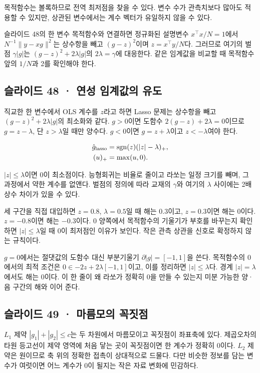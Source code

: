 \documentclass[11pt,a4paper]{article}
\begin{document}
목적함수는 볼록하므로 전역 최저점을 찾을 수 있다. 변수 수가 관측치보다 많아도 적용할 수 있지만, 상관된 변수에서는 계수 벡터가 유일하지 않을 수 있다.\par

슬라이드 48의 한 변수 목적함수와 연결하면 정규화된 설명변수 $x^\top x/N=1$에서 $N^{-1}\|y-xg\|^2$는 상수항을 빼고 $(g-z)^2$이며 $z=x^\top y/N$다. 그러므로 여기의 벌점 $\gamma|g|$는 $(g-z)^2+2\lambda|g|$의 $2\lambda=\gamma$에 대응한다. 같은 임계값을 비교할 때 목적함수 앞의 $1/N$과 2를 확인해야 한다.\par

\subsection{슬라이드 48 · 연성 임계값의 유도}
직교한 한 변수에서 OLS 계수를 $z$라고 하면 Lasso 문제는 상수항을 빼고 $(g-z)^2+2\lambda|g|$의 최소화와 같다. $g>0$이면 도함수 $2(g-z)+2\lambda=0$이므로 $g=z-\lambda$, 단 $z>\lambda$일 때만 양수다. $g<0$이면 $g=z+\lambda$이고 $z<-\lambda$여야 한다.\par

\[
\begin{aligned}
\hat g_{\rm lasso}&=\operatorname{sgn}(z)(|z|-\lambda)_+,\\
(u)_+&=\max(u,0).
\end{aligned}
\]

$|z|\le\lambda$이면 0이 최소점이다. 능형회귀는 비율로 줄이고 라쏘는 일정 크기를 빼며, 그 과정에서 약한 계수를 없앤다. 벌점의 정의에 따라 교재의 $\gamma$와 여기의 $\lambda$ 사이에는 2배 상수 차이가 있을 수 있다.\par

세 구간을 직접 대입하면 $z=0.8$, $\lambda=0.5$일 때 해는 0.3이고, $z=0.3$이면 해는 0이다. $z=-0.8$이면 해는 $-0.3$이다. 0 양쪽에서 목적함수의 기울기가 부호를 바꾸는지 확인하면 $|z|\le\lambda$일 때 0이 최저점인 이유가 보인다. 작은 관측 상관을 신호로 확정하지 않는 규칙이다.\par

$g=0$에서는 절댓값의 도함수 대신 부분기울기 $\partial|g|=[-1,1]$을 쓴다. 목적함수의 0에서의 최적 조건은 $0\in-2z+2\lambda[-1,1]$이고, 이를 정리하면 $|z|\le\lambda$다. 경계 $|z|=\lambda$에서도 해는 0이다. 이 한 줄이 왜 라쏘가 정확히 0을 만들 수 있는지 미분 가능한 양·음 구간의 해와 이어 준다.\par

\subsection{슬라이드 49 · 마름모의 꼭짓점}
$L_1$ 제약 $|g_1|+|g_2|\le c$는 두 차원에서 마름모이고 꼭짓점이 좌표축에 있다. 제곱오차의 타원 등고선이 제약 영역에 처음 닿는 곳이 꼭짓점이면 한 계수가 정확히 0이다. $L_2$ 제약은 원이므로 축 위의 정확한 접촉이 상대적으로 드물다. 다만 비슷한 정보를 담는 변수가 여럿이면 어느 계수가 0이 될지는 작은 자료 변화에 민감하다.\par
\end{document}
